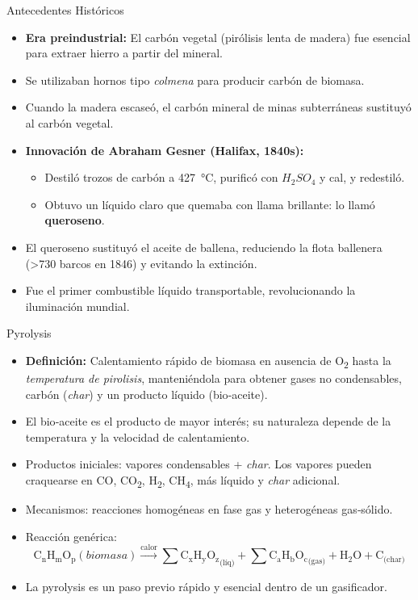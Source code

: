 \documentclass[../../main.tex]{subfiles}
\begin{document}
\begin{frame}{Antecedentes Históricos}
\begin{itemize}
\item \textbf{Era preindustrial:} El carbón vegetal (pirólisis lenta de madera) fue esencial para extraer hierro a partir del mineral.
\item Se utilizaban hornos tipo \emph{colmena} para producir carbón de biomasa.
\item Cuando la madera escaseó, el carbón mineral de minas subterráneas sustituyó al carbón vegetal.
\item \textbf{Innovación de Abraham Gesner (Halifax, 1840s):}
\begin{itemize}
\item Destiló trozos de carbón a \SI{427}{\celsius}, purificó con \(H_2SO_4\) y cal, y redestiló.
\item Obtuvo un líquido claro que quemaba con llama brillante: lo llamó \textbf{queroseno}.
\end{itemize}
\item El queroseno sustituyó el aceite de ballena, reduciendo la flota ballenera (>730 barcos en 1846) y evitando la extinción.
\item Fue el primer combustible líquido transportable, revolucionando la iluminación mundial.
\end{itemize}
\end{frame}
\begin{frame}{Pyrolysis}
\small
\begin{itemize}
  \item \textbf{Definición:} Calentamiento rápido de biomasa en ausencia de O\textsubscript{2} hasta la \emph{temperatura de pirolisis}, manteniéndola para obtener gases no condensables, carbón (\emph{char}) y un producto líquido (bio‑aceite).
  \item El bio‑aceite es el producto de mayor interés; su naturaleza depende de la temperatura y la velocidad de calentamiento.
  \item Productos iniciales: vapores condensables + \emph{char}. Los vapores pueden craquearse en CO, CO\textsubscript{2}, H\textsubscript{2}, CH\textsubscript{4}, más líquido y \emph{char} adicional.
  \item Mecanismos: reacciones homogéneas en fase gas y heterogéneas gas‑sólido.
  \item Reacción genérica:
    \[
      \mathrm{C_{n}H_{m}O_{p}}(biomasa)  \xrightarrow{\text{calor}} 
      \sum\mathrm{C_{x}H_{y}O_{z}}_{\text{(líq)}} +
     \sum \mathrm{C_{a}H_{b}O_{c}}_{\text{(gas)}} + \mathrm{H_2O} + \mathrm{C}_{\text{(char)}}
    \]
  \item La pyrolysis es un paso previo rápido y esencial dentro de un gasificador.
 
\end{itemize}
\end{frame}
\end{document}
